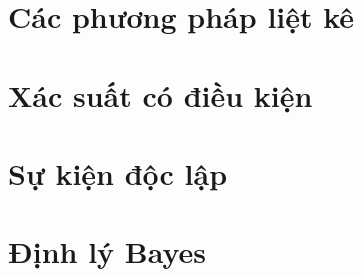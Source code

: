 \documentclass[class=probandstats,crop=false]{standalone}
\begin{document}
\section{Các phương pháp liệt kê}



\section{Xác suất có điều kiện}



\section{Sự kiện độc lập}



\section{Định lý Bayes}
\end{document}
